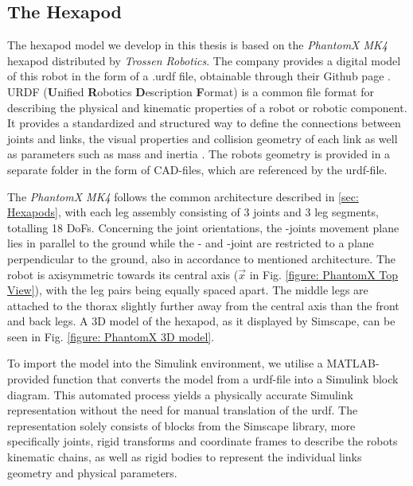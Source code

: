 \subsection{The Hexapod}
The hexapod model we develop in this thesis is based on the \textit{PhantomX MK4} hexapod distributed by \textit{Trossen Robotics}.
The company provides a digital model of this robot in the form of a .urdf file, obtainable through their Github page \parencite{interboticsGithub}.
URDF (\textbf{U}nified \textbf{R}obotics \textbf{D}escription \textbf{F}ormat) is a common file format for describing the physical and kinematic properties of a robot or robotic component.
It provides a standardized and structured way to define the connections between joints and links, the visual properties and collision geometry of each link as well as parameters such as mass and inertia \parencite{matlabURDFDocumentation}.
The robots geometry is provided in a separate folder in the form of CAD-files, which are referenced by the urdf-file.

The \textit{PhantomX MK4} follows the common architecture described in \ref{sec: Hexapods}, with each leg assembly consisting of 3 joints and 3 leg segments, totalling 18 DoFs.
Concerning the joint orientations, the \textalpha-joints movement plane lies in parallel to the ground while the \textbeta- and \textgamma-joint are restricted to a plane perpendicular to the ground, also in accordance to mentioned architecture.
The robot is axisymmetric towards its central axis ($\vec{x}$ in Fig. \ref{figure: PhantomX Top View}), with the leg pairs being equally spaced apart.
The middle legs are attached to the thorax slightly further away from the central axis than the front and back legs.
A 3D model of the hexapod, as it displayed by Simscape, can be seen in Fig. \ref{figure: PhantomX 3D model}.

To import the model into the Simulink environment, we utilise a MATLAB-provided function that converts the model from a urdf-file into a Simulink block diagram.
This automated process yields a physically accurate Simulink representation without the need for manual translation of the urdf.
The representation solely consists of blocks from the Simscape library, more specifically joints, rigid transforms and coordinate frames to describe the robots kinematic chains, as well as rigid bodies to represent the individual links geometry and physical parameters.

